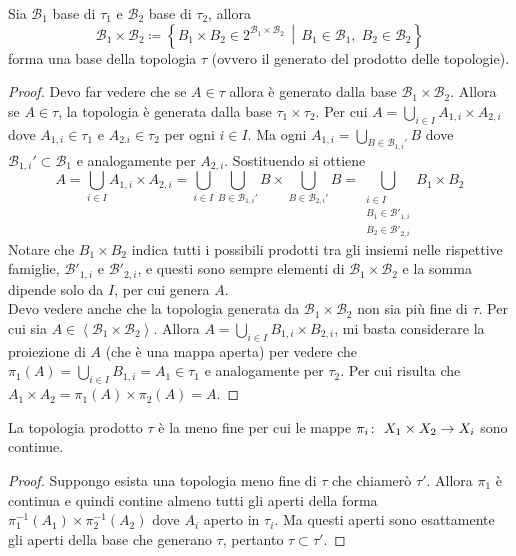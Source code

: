 \begin{theorem}
	Sia $\mathcal{B}_1$ base di $\tau_1$ e $\mathcal{B_2}$ base di $\tau_2$, allora
	\begin{equation*}
		\mathcal{B}_1 \times \mathcal{B}_2 \coloneqq \left\{B_1 \times B_2 \in 2^{\mathcal{B}_1 \times \mathcal{B}_2} \,\middle|\, B_1 \in \mathcal{B}_1, \; B_2 \in \mathcal{B}_2\right\}
	\end{equation*}
	forma una base della topologia $\tau$ (ovvero il generato del prodotto delle topologie).
\end{theorem}
\begin{proof}
	Devo far vedere che se $A \in \tau$ allora è generato dalla base $\mathcal{B}_1 \times \mathcal{B}_2$. Allora se $A \in \tau$, la topologia è generata dalla base $\tau_1 \times \tau_2$. Per cui $A = \bigcup_{i \in I} A_{1,i} \times A_{2,i}$ dove $A_{1,i} \in \tau_1$ e $A_{2.i} \in \tau_2$ per ogni $i \in I$. Ma ogni $A_{1, i} = \bigcup_{B \in \mathcal{B}_{1,i}'} B$ dove $\mathcal{B}_{1,i}' \subset \mathcal{B}_1$ e analogamente per $A_{2,i}$. Sostituendo si ottiene
	\begin{equation*}
		A = \bigcup_{i \in I} A_{1,i} \times A_{2,i} = \bigcup_{i \in I} \bigcup_{B \in \mathcal{B}_{1,i}'} B \times \bigcup_{B \in \mathcal{B}_{2,i}'} B = \bigcup_{\substack{i \in I \\ B_1 \in \mathcal{B}'_{1,i} \\ B_2 \in \mathcal{B}'_{2,i}}} B_1 \times B_2
	\end{equation*}
	Notare che $B_1 \times B_2$ indica tutti i possibili prodotti tra gli insiemi nelle rispettive famiglie, $\mathcal{B}'_{1,i}$ e $\mathcal{B}'_{2,i}$, e questi sono sempre elementi di $\mathcal{B}_1 \times \mathcal{B}_2$ e la somma dipende solo da $I$, per cui genera $A$. \\
	
	Devo vedere anche che la topologia generata da $\mathcal{B}_1 \times \mathcal{B}_2$ non sia più fine di $\tau$. Per cui sia $A \in \left\langle \mathcal{B}_1 \times \mathcal{B}_2 \right\rangle$. Allora $A = \bigcup_{i \in I} B_{1,i} \times B_{2,i}$, mi basta considerare la proiezione di $A$ (che è una mappa aperta) per vedere che $\pi_1(A) = \bigcup_{i \in I} B_{1,i} = A_1 \in \tau_1$ e analogamente per $\tau_2$. Per cui risulta che $A_1 \times A_2 = \pi_1(A) \times \pi_2(A) = A$.
\end{proof}


\begin{theorem}
	La topologia prodotto $\tau$ è la meno fine per cui le mappe $\pi_i \colon\ X_1\times X_2 \rightarrow X_i$ sono continue.
\end{theorem}
\begin{proof}
	Suppongo esista una topologia meno fine di $\tau$ che chiamerò $\tau'$. Allora $\pi_1$ è continua e quindi contine almeno tutti gli aperti della forma $\pi^{-1}_1(A_1) \times \pi^{-1}_2(A_2)$ dove $A_i$ aperto in $\tau_i$. Ma questi aperti sono esattamente gli aperti della base che generano $\tau$, pertanto $\tau \subset \tau'$.
\end{proof}

